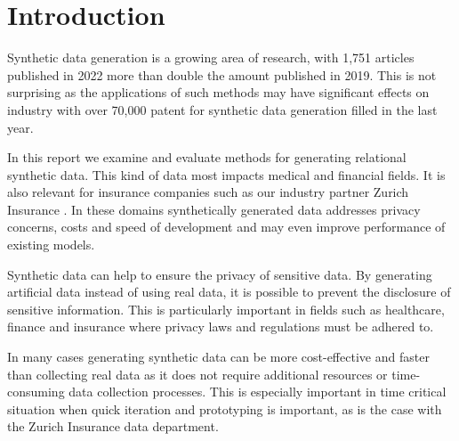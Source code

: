 \documentclass[fleqn,moreauthors,10pt]{ds_report}
\affiliation{\textit{Advisors: prof. dr. Erik Štrumbelj}}
\begin{document}
\flushbottom 

\maketitle 
\thispagestyle{empty} 


\section*{Introduction}
Synthetic data generation is a growing area of research, with 1,751 articles published in 2022 more than double the amount published in 2019. 
This is not surprising as the applications of such methods may have significant effects on industry with over 70,000 patent for synthetic data generation filled in the last year.

In this report we examine and evaluate methods for generating relational synthetic data. 
This kind of data most impacts medical and financial  fields. It is also relevant for insurance companies such as our industry partner Zurich Insurance . In these domains synthetically generated data addresses privacy concerns, costs and speed of development and may even improve performance of existing models. 

Synthetic data can help to ensure the privacy of sensitive data.
By generating artificial data instead of using real data, it is possible to prevent the disclosure of sensitive information. 
This is particularly important in fields such as healthcare, finance and insurance where privacy laws and regulations must be adhered to. 

In many cases generating synthetic data can be more cost-effective and faster than collecting real data as it does not require additional resources or time-consuming data collection processes. 
This is especially important in time critical situation when quick iteration and prototyping is important, as is the case with the Zurich Insurance data department.
\end{document}
